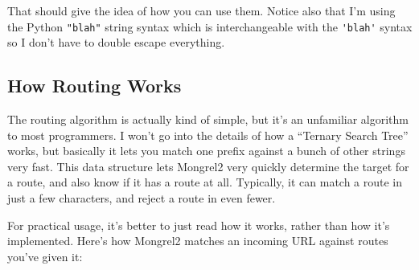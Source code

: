 That should give the idea of how you can use them.  Notice also that I'm using the Python \verb|"blah"| string syntax which is
interchangeable with the \verb|'blah'| syntax so I don't have to double escape everything.

\subsection{How Routing Works}

The routing algorithm is actually kind of simple, but it's an unfamiliar algorithm
to most programmers.  I won't go into the details of how a ``Ternary Search Tree''
works, but basically it lets you match one prefix against a bunch of other strings
very fast.  This data structure lets Mongrel2 very quickly determine the target
for a route, and also know if it has a route at all.  Typically, it can match a route
in just a few characters, and reject a route in even fewer.

For practical usage, it's better to just read how it works, rather than how it's
implemented.  Here's how Mongrel2 matches an incoming URL against routes you've
given it:

